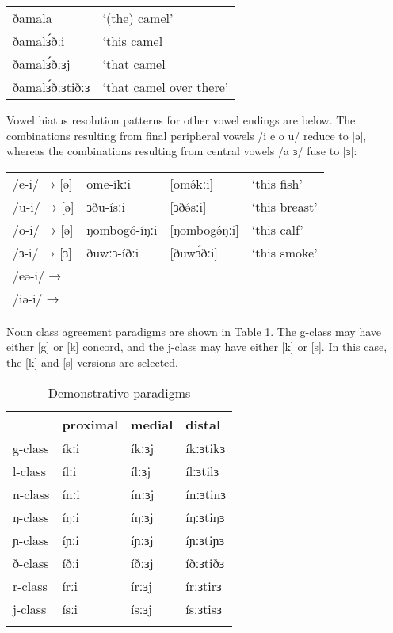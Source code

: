 \ea  \begin{tabular}[t]{ll}
	ðamala		&	`(the) camel'\\ 
	ðamalɜ́ðːi	&	`this camel\\
	ðamalɜ́ðːɜj	&	`that camel\\
	ðamalɜ́ðːɜtiðːɜ	&	`that camel over there’	\\
  \end{tabular}
\z 

Vowel hiatus resolution patterns for other vowel endings are below. The combinations resulting from final peripheral vowels /i e o u/ reduce to [ə], whereas the combinations resulting from central vowels /a ɜ/ fuse to [ɜ]:

\ea \begin{tabular}[t]{llll}
/e-i/ → [ə] &	ome-íkːi 	& [omə́kːi] 		& ‘this fish’\\
/u-i/ → [ə]	& ɜðu-ísːi 		& [ɜðə́sːi] 		& ‘this breast’\\
/o-i/ → [ə]	& ŋombogó-íŋːi 	& [ŋombogə́ŋːi]	& ‘this calf’\\
/ɜ-i/ → [ɜ]	& ðuwːɜ-íðːi 	& [ðuwɜ́ðːi] 	& ‘this smoke’\\
/eə-i/ → & & & \\
/iə-i/ → & & & \\	
 \end{tabular}
\z 
Noun class agreement paradigms are shown in Table \ref{tab:ch8:2}. The g-class may have either [g] or [k] concord, and the j-class may have either [k] or [s]. In this case, the [k] and [s] versions are selected. %

\begin{table}
\begin{tabular}[t]{llll}
	\lsptoprule
		& proximal	&	medial	&	distal\\
\midrule		
g-class	&	íkːi	&	íkːɜj	&	íkːɜtikɜ\\
l-class	&	ílːi	&	ílːɜj	&	ílːɜtilɜ\\
n-class	&	ínːi	&	ínːɜj	&	ínːɜtinɜ\\
ŋ-class	&	íŋːi	&	íŋːɜj	&	íŋːɜtiŋɜ\\
ɲ-class	&	íɲːi	&	íɲːɜj	&	íɲːɜtiɲɜ\\
ð-class	&	íðːi	&	íðːɜj	&	íðːɜtiðɜ\\
r-class	&	írːi	&	írːɜj	&	írːɜtirɜ\\
j-class &	ísːi 	&	ísːɜj	&	ísːɜtisɜ\\
\lspbottomrule
	\end{tabular}
  \caption{Demonstrative paradigms}
  \label{tab:ch8:2}
\end{table}

